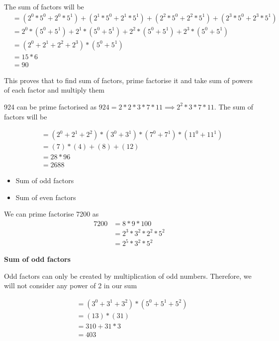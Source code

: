 The sum of factors will be 
\begin{align*}
    &=  ( 2^0 * 5^0 + 2^0 * 5^1 ) + 
        ( 2^1 * 5^0 + 2^1 * 5^1 ) + 
        ( 2^2 * 5^0 + 2^2 * 5^1 ) + 
        ( 2^3 * 5^0 + 2^3 * 5^1 ) \\
    &=  2^0 * (5^0 + 5^1 ) + 
        2^1 * (5^0 + 5^1 ) + 
        2^2 * (5^0 + 5^1 ) + 
        2^3 * (5^0 + 5^1 ) \\
    &=  (2^0 + 2^1 + 2^2 + 2^3) * (5^0 + 5^1 ) \\
    &= 15 * 6 \\
    &= 90
\end{align*}

This proves that to find sum of factors, prime factorise it and take sum of powers of each factor and multiply them


924 can be prime factorised as $924 = 2 * 2 * 3 * 7 * 11 \implies 2^2 * 3 * 7 * 11$. The sum of factors will be 

\begin{align*}
    &= (2^0 + 2^1 + 2^2) * (3^0 + 3^1) * (7^0 + 7^1) * (11^0 + 11^1) \\
    &= (7) * (4) + (8) + (12) \\
    &= 28 * 96 \\
    &= 2688
\end{align*}

\begin{itemize}
    \item Sum of odd factors
    \item Sum of even factors
\end{itemize}

We can prime factorise 7200 as 
\begin{align*}
    7200 &= 8 * 9 * 100 \\
    &= 2^3 * 3^2 * 2^2 * 5^2 \\
    &= 2^5 * 3^2 * 5^2
\end{align*}

\textbf{Sum of odd factors}


Odd factors can only be created by multiplication of odd numbers. Therefore, we will not consider any power of 2 in our sum

\begin{align*}
    &= (3^0 + 3^1 + 3^2) * (5^0 + 5^1 + 5^2) \\
    &= (13) * (31) \\
    &= 310 + 31 * 3 \\
    &= 403 \\
\end{align*}

